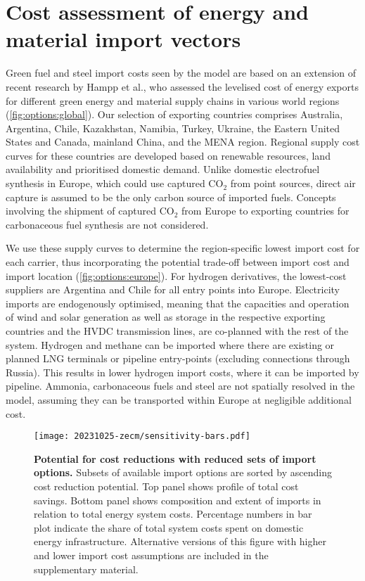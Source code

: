 
\section*{Cost assessment of energy and material import vectors}


Green fuel and steel import costs seen by the model are based on an extension of
recent research by Hampp et al.,\cite{hamppImportOptions2023} who assessed the
levelised cost of energy exports for different green energy and material supply
chains in various world regions (\cref{fig:options:global}). Our selection of
exporting countries comprises Australia, Argentina, Chile, Kazakhstan, Namibia,
Turkey, Ukraine, the Eastern United States and Canada, mainland China, and the
MENA region. Regional supply cost curves for these countries are developed based
on renewable resources, land availability and prioritised domestic demand.
Unlike domestic electrofuel synthesis in Europe, which could use captured CO$_2$
from point sources, direct air capture is assumed to be the only carbon source
of imported fuels. Concepts involving the shipment of captured CO$_2$
from Europe to exporting countries for carbonaceous fuel synthesis are not
considered.\cite{treeenergysolutionsGreenCycle2024,fonderSyntheticMethaneClosing2024}


We use these supply curves to determine the region-specific lowest import cost
for each carrier, thus incorporating the potential trade-off between import cost
and import location (\cref{fig:options:europe}). For hydrogen derivatives, the
lowest-cost suppliers are Argentina and Chile for all entry points into Europe.
Electricity imports are endogenously optimised, meaning that the capacities and
operation of wind and solar generation as well as storage in the respective
exporting countries and the HVDC transmission lines, are co-planned with the
rest of the system. Hydrogen and methane can be imported where there are
existing or planned LNG terminals or pipeline entry-points (excluding
connections through Russia). This results in lower hydrogen import costs, where
it can be imported by pipeline. Ammonia, carbonaceous fuels and steel are not
spatially resolved in the model, assuming they can be transported within Europe
at negligible additional cost.

\begin{figure*}
    \texttt{[image: 20231025-zecm/sensitivity-bars.pdf]}
    \caption{\textbf{Potential for cost reductions with reduced sets of import options.}
        Subsets of available import options are sorted by ascending cost
        reduction potential. Top panel shows profile of total cost savings.
        Bottom panel shows composition and extent of imports in relation to
        total energy system costs. Percentage numbers in bar plot indicate the
        share of total system costs spent on domestic energy infrastructure.
        Alternative versions of this figure with higher and lower import cost
        assumptions are included in the supplementary material. }
    \label{fig:sensitivity-bars}
\end{figure*}

